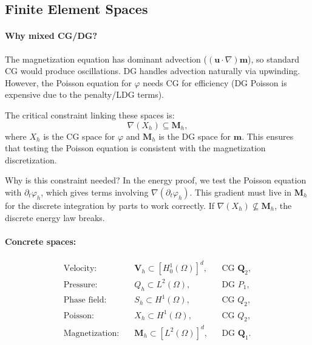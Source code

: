\documentclass[11pt,a4paper]{article}
\theoremstyle{definition}
\theoremstyle{remark}
\newcommand{\dt}{\partial_t}
\newcommand{\grad}{\nabla}
\newcommand{\bfu}{\bm{u}}
\newcommand{\bfm}{\bm{m}}
\newcommand{\bfM}{\bm{M}}
\newcommand{\bfV}{\bm{V}}
\begin{document}
\subsection{Finite Element Spaces}
\label{sec:fe-spaces}

\paragraph{Why mixed CG/DG?}
The magnetization equation has dominant advection
($(\bfu\cdot\grad)\bfm$), so standard CG would produce oscillations.
DG handles advection naturally via upwinding. However, the Poisson
equation for $\varphi$ needs CG for efficiency (DG Poisson is expensive
due to the penalty/LDG terms).

The critical constraint linking these spaces is:
\begin{equation}
  \label{eq:space-constraint}
  \boxed{
    \grad(X_h) \subseteq \bfM_h,
  }
\end{equation}
where $X_h$ is the CG space for $\varphi$ and $\bfM_h$ is the DG space
for $\bfm$. This ensures that testing the Poisson equation is consistent
with the magnetization discretization.

\begin{derivnote}
Why is this constraint needed? In the energy proof, we test the Poisson
equation with $\dt\varphi_h$, which gives terms involving
$\grad(\dt\varphi_h)$. This gradient must live in $\bfM_h$ for the
discrete integration by parts to work correctly. If $\grad(X_h) \not\subseteq \bfM_h$, the discrete energy law breaks.
\end{derivnote}

\paragraph{Concrete spaces:}
\begin{equation}
  \label{eq:spaces}
  \begin{aligned}
    \text{Velocity:}\quad &\bfV{}_h \subset [H^1_0(\Omega)]^d,
      &&\text{CG } \bm{Q}_2, \\
    \text{Pressure:}\quad &Q_h \subset L^2(\Omega),
      &&\text{DG } P_1, \\
    \text{Phase field:}\quad &S_h \subset H^1(\Omega),
      &&\text{CG } Q_2, \\
    \text{Poisson:}\quad &X_h \subset H^1(\Omega),
      &&\text{CG } Q_2, \\
    \text{Magnetization:}\quad &\bfM_h \subset [L^2(\Omega)]^d,
      &&\text{DG } \bm{Q}_1.
  \end{aligned}
\end{equation}
\end{document}
